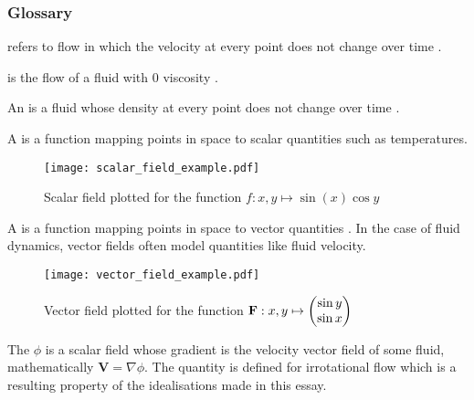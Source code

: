 \subsubsection{Glossary}
\begin{defn} %
     refers to flow in which the velocity at every point does not change over time \cite{CRACIUNOIU2001559}.
\end{defn}
\begin{defn} %
     is the flow of a fluid with 0 viscosity \cite{ANDERSON20031}.
\end{defn}
\begin{defn}\label{definition:INCOMPRESSIBLE} %
    An  is a fluid whose density at every point does not change over time \cite{AHMED2019331}.
\end{defn}
\begin{defn} %
	A  is a function mapping points in space to scalar quantities such as temperatures.

	\begin{figure*}[!ht]
		\texttt{[image: scalar\_field\_example.pdf]}
		\centering
		\caption{Scalar field plotted for the function $f:x,y\mapsto\sin(x)\cos y$}
		\label{figure:SCALARFIELD}
	\end{figure*}
\end{defn}
\begin{defn} %
    A  is a function mapping points in space to vector quantities \cite{BREZINSKI20063}. In
	the case of fluid dynamics, vector fields often model quantities like fluid velocity.

	\begin{figure*}[!ht]
		\texttt{[image: vector\_field\_example.pdf]}
		\centering
		\caption{Vector field plotted for the function $\mathbf{F}:x,y\mapsto\begin{pmatrix}
			\sin y\\\sin x
		\end{pmatrix}$}
		\label{figure:VECTORFIELD}
	\end{figure*}
\end{defn}
\begin{defn}\label{definition:VP} %
	The  $\phi$ is a scalar field whose gradient is the velocity vector field of some
	fluid, mathematically $\mathbf{V}=\nabla\phi$. The quantity is defined for irrotational flow which is a resulting
	property of the idealisations made in this essay.
\end{defn}


